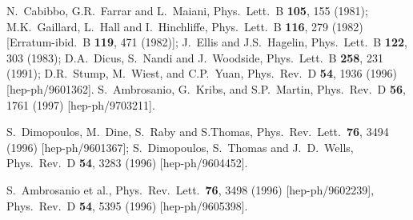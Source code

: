 \documentclass[11pt]{article}
\begin{document}
\begin{thebibliography}{999}
N.~Cabibbo, G.R.~Farrar and L.~Maiani,
  Phys.\ Lett.\ B {\bf 105}, 155 (1981);
M.K.~Gaillard, L.~Hall and I.~Hinchliffe, 
  Phys.\ Lett.\ B {\bf 116}, 279 (1982)
  [Erratum-ibid.\ B {\bf 119}, 471 (1982)];
J.~Ellis and J.S.~Hagelin, 
  Phys.\ Lett.\ B {\bf 122}, 303 (1983);
D.A.~Dicus, S.~Nandi and J.~Woodside, 
  Phys.\ Lett.\ B {\bf 258}, 231 (1991);
D.R.~Stump, M.~Wiest, and C.P.~Yuan, 
  Phys.\ Rev.\ D {\bf 54}, 1936 (1996)
  [hep-ph/9601362].
S.~Ambrosanio, G.~Kribs, and S.P.~Martin, 
  Phys.\ Rev.\ D {\bf 56}, 1761 (1997)
  [hep-ph/9703211].

S.~Dimopoulos, M.~Dine, S.~Raby and S.Thomas,
  Phys.\ Rev.\ Lett.\  {\bf 76}, 3494 (1996)
  [hep-ph/9601367];
S.~Dimopoulos, S.~Thomas and J.~D.~Wells,
  Phys.\ Rev.\ D {\bf 54}, 3283 (1996)
  [hep-ph/9604452].

S.~Ambrosanio et al.,
  Phys.\ Rev.\ Lett.\  {\bf 76}, 3498  (1996)
  [hep-ph/9602239],
  Phys.\ Rev.\ D {\bf 54}, 5395 (1996)
  [hep-ph/9605398].


\end{thebibliography}
\end{document}
